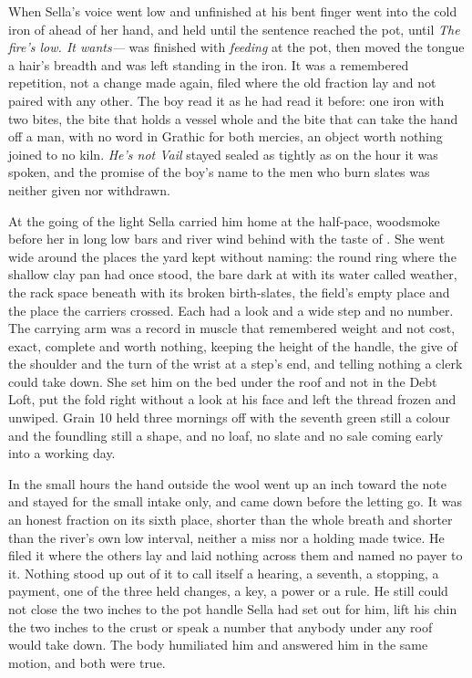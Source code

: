 When Sella's voice went low and unfinished at  his bent finger went into the cold iron of  ahead of her hand, and held until the sentence reached the pot, until \emph{The fire's low. It wants---} was finished with \emph{feeding} at the pot, then moved the tongue a hair's breadth and was left standing in the iron. It was a remembered repetition, not a change made again, filed where the old fraction lay and not paired with any other. The boy read it as he had read it before: one iron with two bites, the bite that holds a vessel whole and the bite that can take the hand off a man, with no word in Grathic for both mercies, an object worth nothing joined to no kiln. \emph{He's not Vail} stayed sealed as tightly as on the hour it was spoken, and the promise of the boy's name to the men who burn slates was neither given nor withdrawn.

\scenebreak

At the going of the light Sella carried him home at the half-pace, woodsmoke before her in long low bars and river wind behind with the taste of . She went wide around the places the yard kept without naming: the round ring where the shallow clay pan had once stood, the bare dark  at  with its water called weather, the rack space beneath  with its broken birth-slates, the field's empty place and the place the carriers crossed. Each had a look and a wide step and no number. The carrying arm was a record in muscle that remembered weight and not cost, exact, complete and worth nothing, keeping the height of the handle, the give of the shoulder and the turn of the wrist at a step's end, and telling nothing a clerk could take down. She set him on the bed under the roof and not in the Debt Loft, put the fold right without a look at his face and left the thread frozen and unwiped. Grain 10 held three mornings off with the seventh green still a colour and the foundling still a shape, and no loaf, no slate and no sale coming early into a working day.

In the small hours the hand outside the wool went up an inch toward the note and stayed for the small intake only, and came down before the letting go. It was an honest fraction on its sixth place, shorter than the whole breath and shorter than the river's own low interval, neither a miss nor a holding made twice. He filed it where the others lay and laid nothing across them and named no payer to it. Nothing stood up out of it to call itself a hearing, a seventh, a stopping, a payment, one of the three held changes, a key, a power or a rule. He still could not close the two inches to the pot handle Sella had set out for him, lift his chin the two inches to the crust or speak a number that anybody under any roof would take down. The body humiliated him and answered him in the same motion, and both were true.


